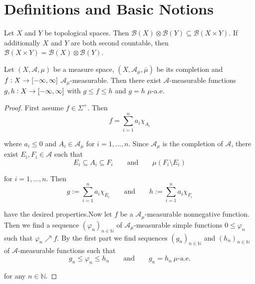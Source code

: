 \section{Definitions and Basic Notions}

\begin{proposition}
	Let $X$ and $Y$ be topological spaces. Then $\mathcal{B}(X) \otimes \mathcal{B}(Y) \subseteq \mathcal{B}(X \times Y)$. If additionally $X$ and $Y$ are both second countable, then $\mathcal{B}(X\times Y) = \mathcal{B}(X) \otimes \mathcal{B}(Y)$.
\end{proposition}

\begin{proposition}
	Let $(X,\mathcal{A},\mu)$ be a measure space, $(X,\mathcal{A}_\mu,\overline{\mu})$ be its completion and $f: X \to \intcc[0]{-\infty,\infty}$ $\mathcal{A}_\mu$-measurable. Then there exist $\mathcal{A}$-measurable functions $g,h: X \to \intcc[0]{-\infty,\infty}$ with $g \leq f \leq h$ and $g = h$ $\mu$-a.e.
\end{proposition}

\begin{proof}
	First assume $f \in \Sigma^+$. Then 
	\begin{equation}
		f = \sum_{i = 1}^n a_i \chi_{A_i}
	\end{equation}

	\noindent where $a_i \leq 0$ and $A_i \in \mathcal{A}_\mu$ for $i = 1,\dots,n$. Since $\mathcal{A}_\mu$ is the completion of $\mathcal{A}$, there exist $E_i,F_i \in \mathcal{A}$ such that 
	\begin{equation}
		E_i \subseteq A_i \subseteq F_i \qquad \text{and} \qquad \mu(F_i \setminus E_i)
	\end{equation}

	\noindent for $i = 1,\dots,n$. Then 
	\begin{equation}
		g := \sum_{i = 1}^n a_i \chi_{E_i} \qquad \text{and} \qquad h := \sum_{i = 1}^n a_i \chi_{F_i}
	\end{equation}

	\noindent have the desired properties.Now let $f$ be a $\mathcal{A}_\mu$-measurable nonnegative function. Then we find a sequence $(\varphi_n)_{n \in \mathbb{N}}$ of $\mathcal{A}_\mu$-measurable simple functions $0 \leq \varphi_n$ such that $\varphi_n \nearrow f$. By the first part we find sequences $(g_n)_{n\in\mathbb{N}}$ and $(h_n)_{n \in \mathbb{N}}$ of $\mathcal{A}$-measurable functions such that 
	\begin{equation}
		g_n \leq \varphi_n \leq h_n \qquad \text{and} \qquad g_n = h_n \>\mu\text{-a.e.}
	\end{equation}

	\noindent for any $n \in \mathbb{N}$.
\end{proof}

